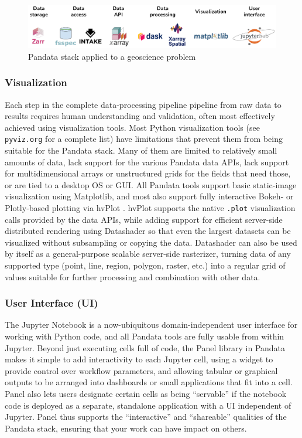 \begin{figure}[h]
    \includegraphics[width=\textwidth]{pandata-geoscience.png}
    \caption{Pandata stack applied to a geoscience problem}
    \label{pandata-geoscience}
\end{figure}
\subsubsection{Visualization}

Each step in the complete data-processing pipeline pipeline from raw data to results requires human understanding and validation, often most effectively achieved using visualization tools. Most Python visualization tools (see \texttt{pyviz.org} for a complete list) have limitations that prevent them from being suitable for the Pandata stack. Many of them are limited to relatively small amounts of data, lack support for the various Pandata data APIs, lack support for multidimensional arrays or unstructured grids for the fields that need those, or are tied to a desktop OS or GUI. All Pandata tools support basic static-image visualization using Matplotlib, and most also support fully interactive Bokeh- or Plotly-based plotting via hvPlot \citep{rudiger:hvplot}. hvPlot supports the native \texttt{.plot} visualization calls provided by the data APIs, while adding support for efficient server-side distributed rendering using Datashader so that even the largest datasets can be visualized without subsampling or copying the data. Datashader can also be used by itself as a general-purpose scalable server-side rasterizer, turning data of any supported type (point, line, region, polygon, raster, etc.) into a regular grid of values suitable for further processing and combination with other data.

\subsubsection{User Interface (UI)}

The Jupyter Notebook is a now-ubiquitous domain-independent user interface for working with Python code, and all Pandata tools are fully usable from within Jupyter. Beyond just executing cells full of code, the Panel library in Pandata makes it simple to add interactivity to each Jupyter cell, using a widget to provide control over workflow parameters, and allowing tabular or graphical outputs to be arranged into dashboards or small applications that fit into a cell. Panel also lets users designate certain cells as being ``servable'' if the notebook code is deployed as a separate, standalone application with a UI independent of Jupyter. Panel thus supports the ``interactive'' and ``shareable'' qualities of the Pandata stack, ensuring that your work can have impact on others.

